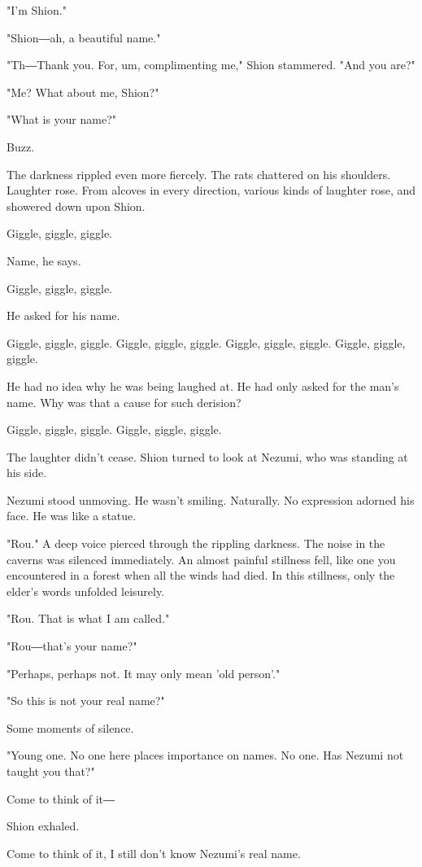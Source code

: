 "I'm Shion."

"Shion―ah, a beautiful name."

"Th―Thank you. For, um, complimenting me," Shion stammered. "And you
are?"

"Me? What about me, Shion?"

"What is your name?"

Buzz.

The darkness rippled even more fiercely. The rats chattered on his
shoulders. Laughter rose. From alcoves in every direction, various kinds
of laughter rose, and showered down upon Shion.

Giggle, giggle, giggle.

Name, he says.

Giggle, giggle, giggle.

He asked for his name.

Giggle, giggle, giggle. Giggle, giggle, giggle. Giggle, giggle, giggle.
Giggle, giggle, giggle.

He had no idea why he was being laughed at. He had only asked for the
man's name. Why was that a cause for such derision?

Giggle, giggle, giggle. Giggle, giggle, giggle.

The laughter didn't cease. Shion turned to look at Nezumi, who was
standing at his side.

Nezumi stood unmoving. He wasn't smiling. Naturally. No expression
adorned his face. He was like a statue.

"Rou." A deep voice pierced through the rippling darkness. The noise in
the caverns was silenced immediately. An almost painful stillness fell,
like one you encountered in a forest when all the winds had died. In
this stillness, only the elder's words unfolded leisurely.

"Rou. That is what I am called."

"Rou―that's your name?"

"Perhaps, perhaps not. It may only mean 'old person'."

"So this is not your real name?"

Some moments of silence.

"Young one. No one here places importance on names. No one. Has Nezumi
not taught you that?"

Come to think of it―

Shion exhaled.

Come to think of it, I still don't know Nezumi's real name.

